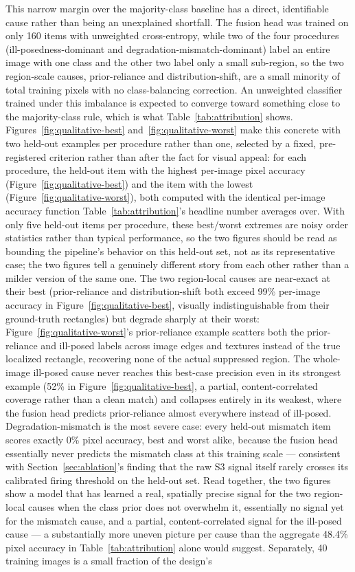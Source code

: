 \documentclass[review]{elsarticle}
\begin{document}
This narrow margin over the majority-class baseline has a direct, identifiable cause rather than being an unexplained shortfall. The fusion head was trained on only 160 items with unweighted cross-entropy, while two of the four procedures (ill-posedness-dominant and degradation-mismatch-dominant) label an entire image with one class and the other two label only a small sub-region, so the two region-scale causes, prior-reliance and distribution-shift, are a small minority of total training pixels with no class-balancing correction. An unweighted classifier trained under this imbalance is expected to converge toward something close to the majority-class rule, which is what Table~\ref{tab:attribution} shows. Figures~\ref{fig:qualitative-best} and~\ref{fig:qualitative-worst} make this concrete with two held-out examples per procedure rather than one, selected by a fixed, pre-registered criterion rather than after the fact for visual appeal: for each procedure, the held-out item with the highest per-image pixel accuracy (Figure~\ref{fig:qualitative-best}) and the item with the lowest (Figure~\ref{fig:qualitative-worst}), both computed with the identical per-image accuracy function Table~\ref{tab:attribution}'s headline number averages over. With only five held-out items per procedure, these best/worst extremes are noisy order statistics rather than typical performance, so the two figures should be read as bounding the pipeline's behavior on this held-out set, not as its representative case; the two figures tell a genuinely different story from each other rather than a milder version of the same one. The two region-local causes are near-exact at their best (prior-reliance and distribution-shift both exceed 99\% per-image accuracy in Figure~\ref{fig:qualitative-best}, visually indistinguishable from their ground-truth rectangles) but degrade sharply at their worst: Figure~\ref{fig:qualitative-worst}'s prior-reliance example scatters both the prior-reliance and ill-posed labels across image edges and textures instead of the true localized rectangle, recovering none of the actual suppressed region. The whole-image ill-posed cause never reaches this best-case precision even in its strongest example (52\% in Figure~\ref{fig:qualitative-best}, a partial, content-correlated coverage rather than a clean match) and collapses entirely in its weakest, where the fusion head predicts prior-reliance almost everywhere instead of ill-posed. Degradation-mismatch is the most severe case: every held-out mismatch item scores exactly 0\% pixel accuracy, best and worst alike, because the fusion head essentially never predicts the mismatch class at this training scale — consistent with Section~\ref{sec:ablation}'s finding that the raw S3 signal itself rarely crosses its calibrated firing threshold on the held-out set. Read together, the two figures show a model that has learned a real, spatially precise signal for the two region-local causes when the class prior does not overwhelm it, essentially no signal yet for the mismatch cause, and a partial, content-correlated signal for the ill-posed cause — a substantially more uneven picture per cause than the aggregate 48.4\% pixel accuracy in Table~\ref{tab:attribution} alone would suggest. Separately, 40 training images is a small fraction of the design's 
\end{document}
